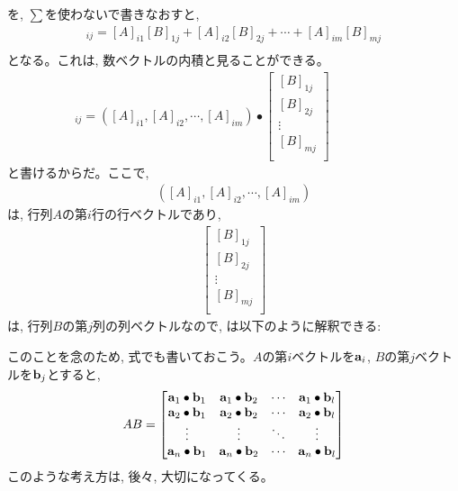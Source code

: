 を, $\sum$を使わないで書きなおすと, 
\begin{eqnarray}
[AB]_{ij}=[A]_{i1}[B]_{1j}+[A]_{i2}[B]_{2j}+\cdots+[A]_{im}[B]_{mj}\nonumber\\\label{eq:defmatrixproduct2}
\end{eqnarray}
となる。これは, 数ベクトルの内積と見ることができる。
\begin{eqnarray}
[AB]_{ij}=([A]_{i1}, [A]_{i2}, \cdots, [A]_{im})\bullet 
\begin{bmatrix}
[B]_{1j}\\
[B]_{2j}\\
\vdots\\
[B]_{mj}\\
\end{bmatrix}\quad\quad\quad\quad\quad\label{eq:defmatrixproduct3}
\end{eqnarray}
と書けるからだ。ここで, 
\begin{eqnarray*}
([A]_{i1}, [A]_{i2}, \cdots, [A]_{im})
\end{eqnarray*}
は, 行列$A$の第$i$行の行ベクトルであり, 
\begin{eqnarray*}
\begin{bmatrix}
[B]_{1j}\\
[B]_{2j}\\
\vdots\\
[B]_{mj}\\
\end{bmatrix}\end{eqnarray*}
は, 行列$B$の第$j$列の列ベクトルなので, 
は以下のように解釈できる: 

このことを念のため, 式でも書いておこう。$A$の第$i$ベクトルを${\bf a}_i$, 
$B$の第$j$ベクトルを${\bf b}_j$とすると, 
\begin{eqnarray}
AB=
\begin{bmatrix}
{\bf a}_1\bullet{\bf b}_1 & {\bf a}_1\bullet{\bf b}_2 & \cdots & {\bf a}_1\bullet{\bf b}_l\\
{\bf a}_2\bullet{\bf b}_1 & {\bf a}_2\bullet{\bf b}_2 & \cdots & {\bf a}_2\bullet{\bf b}_l\\
\vdots & \vdots & \ddots & \vdots\\
{\bf a}_n\bullet{\bf b}_1 & {\bf a}_n\bullet{\bf b}_2 & \cdots & {\bf a}_n\bullet{\bf b}_l\\
\end{bmatrix}\label{eq:AB_matprod_inprod}
\end{eqnarray}
このような考え方は, 後々, 大切になってくる。\\


